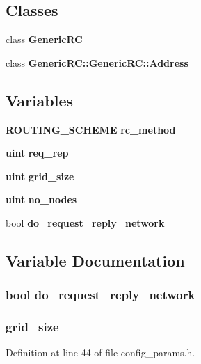 \subsection*{Classes}
\begin{CompactItemize}
\item 
class {\bf GenericRC}
\item 
class {\bf GenericRC::GenericRC::Address}
\end{CompactItemize}
\subsection*{Variables}
\begin{CompactItemize}
\item 
{\bf ROUTING\_\-SCHEME} {\bf rc\_\-method}
\item 
{\bf uint} {\bf req\_\-rep}
\item 
{\bf uint} {\bf grid\_\-size}
\item 
{\bf uint} {\bf no\_\-nodes}
\item 
bool {\bf do\_\-request\_\-reply\_\-network}
\end{CompactItemize}


\subsection{Variable Documentation}
\subsubsection[{do\_\-request\_\-reply\_\-network}]{\setlength{\rightskip}{0pt plus 5cm}bool {\bf do\_\-request\_\-reply\_\-network}}\label{genericRC_8h_2976beeaac1dac17127bde86434feb4b}


\subsubsection[{grid\_\-size}]{ {\bf grid\_\-size}}\label{genericRC_8h_7cdd59c13b3ee2f719faf442120c1411}




Definition at line 44 of file config\_\-params.h.

